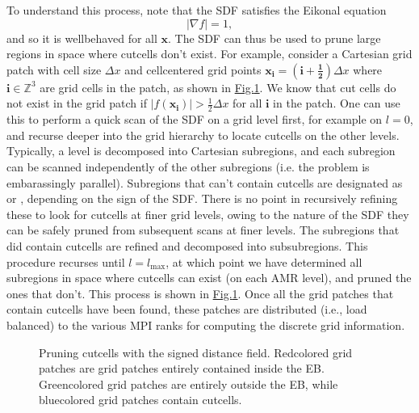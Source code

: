 \documentclass[letterpaper,10pt,english]{sphinxmanual}
\let\sphinxpxdimen\pdfpxdimen\else\newdimen\sphinxpxdimen
\begin{document}
To understand this process, note that the SDF satisfies the Eikonal equation
\begin{equation}
\left|\nabla f\right| = 1,
\end{equation}
and so it is well\sphinxhyphen{}behaved for all \(\mathbf{x}\).
The SDF can thus be used to prune large regions in space where cut\sphinxhyphen{}cells don’t exist.
For example, consider a Cartesian grid patch with cell size \(\Delta x\) and cell\sphinxhyphen{}centered grid points \(\mathbf{x}_{\mathbf{i}} = \left(\mathbf{i} + \mathbf{\frac{1}{2}}\right)\Delta x\) where \(\mathbf{i} \in \mathbb{Z}^3\) are grid cells in the patch, as shown in \hyperref[\detokenize{Source/SpatialDiscretization:fig-pruning}]{Fig.\@ \ref{\detokenize{Source/SpatialDiscretization:fig-pruning}}}.
We know that cut cells do not exist in the grid patch if \(\left|f\left(\mathbf{x}_{\mathbf{i}}\right)\right| > \frac{1}{2}\Delta x\) for all \(\mathbf{i}\) in the patch.
One can use this to perform a quick scan of the SDF on a  grid level first, for example on \(l=0\), and recurse deeper into the grid hierarchy to locate cut\sphinxhyphen{}cells on the other levels.
Typically, a level is decomposed into Cartesian subregions, and each subregion can be scanned independently of the other subregions (i.e. the problem is embarassingly parallel).
Subregions that can’t contain cut\sphinxhyphen{}cells are designated as  or , depending on the sign of the SDF.
There is no point in recursively refining these to look for cut\sphinxhyphen{}cells at finer grid levels, owing to the nature of the SDF they can be safely pruned from subsequent scans at finer levels.
The subregions that did contain cut\sphinxhyphen{}cells are refined and decomposed into sub\sphinxhyphen{}subregions.
This procedure recurses until \(l=l_{\text{max}}\), at which point we have determined all sub\sphinxhyphen{}regions in space where cut\sphinxhyphen{}cells can exist (on each AMR level), and pruned the ones that don’t.
This process is shown in \hyperref[\detokenize{Source/SpatialDiscretization:fig-pruning}]{Fig.\@ \ref{\detokenize{Source/SpatialDiscretization:fig-pruning}}}.
Once all the grid patches that contain cut\sphinxhyphen{}cells have been found, these patches are distributed (i.e., load balanced) to the various MPI ranks for computing the discrete grid information.

\begin{figure}[htb]
\centering
\capstart

\noindent\sphinxincludegraphics[width=600\sphinxpxdimen]{{Pruning}.png}
\caption{Pruning cut\sphinxhyphen{}cells with the signed distance field.
Red\sphinxhyphen{}colored grid patches are grid patches entirely contained inside the EB.
Green\sphinxhyphen{}colored grid patches are entirely outside the EB, while blue\sphinxhyphen{}colored grid patches contain cut\sphinxhyphen{}cells.}\label{\detokenize{Source/SpatialDiscretization:id10}}\label{\detokenize{Source/SpatialDiscretization:fig-pruning}}\end{figure}
\end{document}
